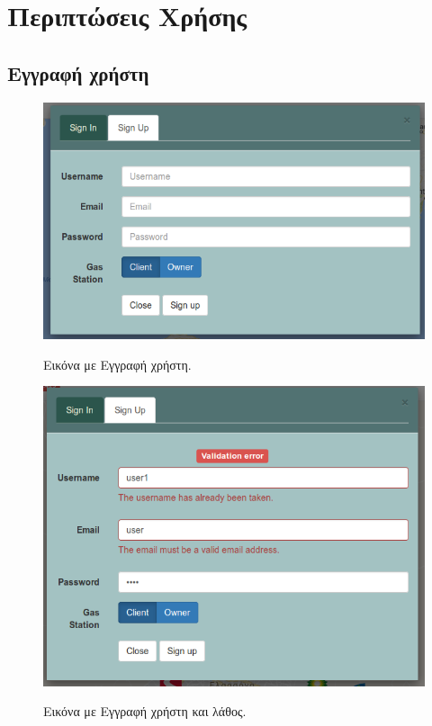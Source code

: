 \section{Περιπτώσεις Χρήσης}
\subsection{Εγγραφή χρήστη}

\begin{figure}[H]
  \caption{Εικόνα με Εγγραφή χρήστη.}
  \centering
    \includegraphics[width=1\textwidth]{img/register.png}
    \label{fig:register}
\end{figure}

\begin{figure}[H]
  \caption{Εικόνα με Εγγραφή χρήστη και λάθος.}
  \centering
    \includegraphics[width=1\textwidth]{img/register-error.png}
    \label{fig:register-error}
\end{figure}

